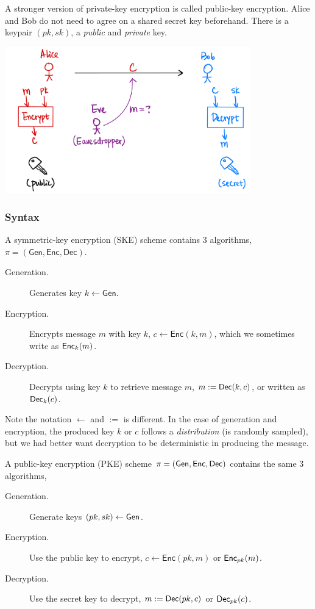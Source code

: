 A stronger version of private-key encryption is called public-key encryption. Alice and Bob do not need to agree on a shared secret key beforehand. There is a keypair $(pk, sk)$, a \emph{public} and \emph{private} key.

\begin{center}
    \includegraphics[width=0.8\textwidth]{images/2023-01-31/pke-intro.png}
\end{center}

\subsubsection{Syntax}
\begin{definition}
    A symmetric-key encryption (SKE) scheme contains 3 algorithms, $\pi = (\mathsf{Gen}, \mathsf{Enc}, \mathsf{Dec})$.

    \begin{description}
        \item[Generation.] Generates key $k\leftarrow \mathsf{Gen}$.
        \item[Encryption.] Encrypts message $m$ with key $k$, $c\leftarrow \mathsf{Enc}(k, m)$, which we sometimes write as $\operatorname{\mathsf{Enc}}_k(m)$.
        \item[Decryption.] Decrypts using key $k$ to retrieve message $m$, $m := \operatorname{\mathsf{Dec}}(k, c)$, or written as $\operatorname{\mathsf{Dec}}_k(c)$.
    \end{description}
    Note the notation $\leftarrow$ and $:=$ is different. In the case of generation and encryption, the produced key $k$ or $c$ follows a \emph{distribution} (is randomly sampled), but we had better want decryption to be deterministic in producing the message.
\end{definition}

\begin{definition}
    A public-key encryption (PKE) scheme $\pi = (\operatorname{\mathsf{Gen}}, \operatorname{\mathsf{Enc}}, \operatorname{\mathsf{Dec}})$ contains the same $3$ algorithms,

    \begin{description}
        \item[Generation.] Generate keys $(pk, sk)\leftarrow \operatorname{\mathsf{Gen}}$.
        \item[Encryption.] Use the public key to encrypt, $c\leftarrow \mathsf{Enc}(pk, m)$ or $\operatorname{\mathsf{Enc}}_{pk}(m)$.
        \item[Decryption.] Use the secret key to decrypt, $m:=\operatorname{\mathsf{Dec}}(pk, c)$ or $\operatorname{\mathsf{Dec}}_{pk}(c)$.
    \end{description}

\end{definition}

